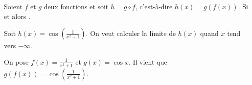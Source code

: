       \begin{thm}
            Soient $f$ et $g$ deux fonctions et soit $h = g\circ f$, c'est-\`a-dire $h(x) = g\left( f(x) \right)$.
            Si  
            et  
            alors .
            
            \begin{ex}
                  Soit $h(x) = \cos \left( \frac{1}{x^2 + 1} \right)$.
                  On veut calculer la limite de $h(x)$ quand $x$ tend vers $-\infty$.
                  
                  On pose $f(x) = \frac{1}{x^2 + 1}$ et $g(x) = \cos x$.
                  Il vient que $g\left(f(x)\right) = \cos \left( \frac{1}{x^2 + 1} \right)$.
                  

\end{ex}
\end{thm}
